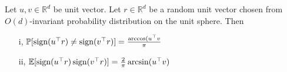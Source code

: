 \begin{mylemma}
	Let $u,v\in\mathbb{R}^d$ be unit vector. Let $r\in\mathbb{R}^d$ be a random unit vector chosen from $O(d)$-invariant probability distribution on the unit sphere. Then
	\begin{enumerate}
		\item[i,] $\mathbb{P}[\operatorname{sign}(u^\top r)\neq\operatorname{sign}(v^\top r)]=\frac{\arccos(u^\top v}{\pi}$
		\item[ii,] $\mathbb{E}[\operatorname{sign}(u^\top r)\operatorname{sign}(v^\top r)]=\frac{2}{\pi}\arcsin(u^\top v)$
	\end{enumerate}
\end{mylemma}